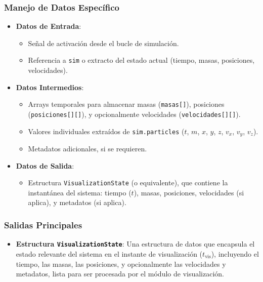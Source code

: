 \subsubsection{Manejo de Datos Específico}
\begin{itemize}
    \item \textbf{Datos de Entrada}:
    \begin{itemize}
        \item Señal de activación desde el bucle de simulación.
        \item Referencia a \texttt{sim} o extracto del estado actual (tiempo, masas, posiciones, velocidades).
    \end{itemize}
    \item \textbf{Datos Intermedios}:
    \begin{itemize}
        \item Arrays temporales para almacenar masas (\texttt{masas[]}), posiciones (\texttt{posiciones[][]}), y opcionalmente velocidades (\texttt{velocidades[][]}).
        \item Valores individuales extraídos de \texttt{sim.particles} ($t$, $m$, $x$, $y$, $z$, $v_x$, $v_y$, $v_z$).
        \item Metadatos adicionales, si se requieren.
    \end{itemize}
    \item \textbf{Datos de Salida}:
    \begin{itemize}
        \item Estructura \texttt{VisualizationState} (o equivalente), que contiene la instantánea del sistema: tiempo ($t$), masas, posiciones, velocidades (si aplica), y metadatos (si aplica).
    \end{itemize}
\end{itemize}

\subsubsection{Salidas Principales}
\begin{itemize}
    \item \textbf{Estructura \texttt{VisualizationState}}: Una estructura de datos que encapsula el estado relevante del sistema en el instante de visualización ($t_{\text{vis}}$), incluyendo el tiempo, las masas, las posiciones, y opcionalmente las velocidades y metadatos, lista para ser procesada por el módulo de visualización.
\end{itemize}

